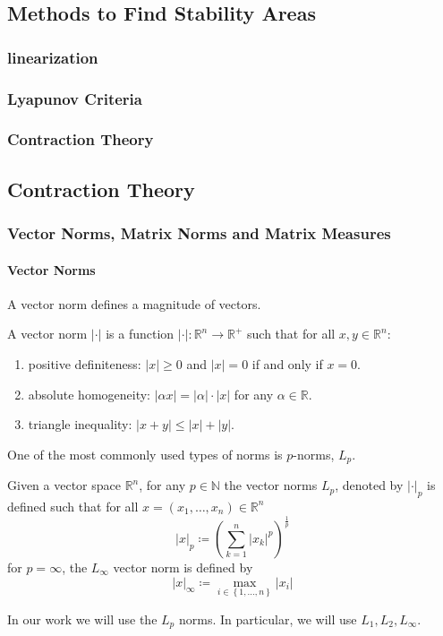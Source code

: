 \documentclass[12pt,English]{article}
\begin{document}
\subsection{Methods to Find Stability Areas}
\subsubsection{linearization}
\subsubsection{Lyapunov Criteria}
\subsubsection{Contraction Theory}

\subsection{Contraction Theory}

\subsubsection{Vector Norms, Matrix Norms and Matrix Measures}
\paragraph{Vector Norms}\hfill\break
A vector norm defines a magnitude of vectors.
\begin{defn}
A vector norm $\left|\cdot\right|$ is a function $\left|\cdot\right|:\mathbb{R}^{n}\rightarrow\mathbb{R}^{+}$
such that for all $x,y\in\mathbb{R}^{n}$:
\begin{enumerate}
\item positive definiteness: $\left|x\right|\geq0$ and $\left|x\right|=0$
if and only if $x=0$.
\item absolute homogeneity: $\left|\alpha x\right|=\left|\alpha\right|\cdot\left|x\right|$
for any $\alpha\in\mathbb{R}$.
\item triangle inequality: $\left|x+y\right|\leq\left|x\right|+\left|y\right|$.
\end{enumerate}
\end{defn}
%
One of the most commonly used types of norms is $p$-norms, $L_{p}$.
\begin{defn}
Given a vector space $\mathbb{R}^{n}$, for any $p\in\mathbb{N}$
the vector norms $L_{p}$, denoted by $\left|\cdot\right|_{p}$ is
defined such that for all $x=\left(x_{1},\dots,x_{n}\right)\in\mathbb{R}^{n}$
$$
\left|x\right|_{p}\coloneqq\left(\sum_{k=1}^{n}\left|x_{k}\right|^{p}\right)^{\frac{1}{p}}
$$
for $p=\infty$, the $L_{\infty}$ vector norm is defined by
$$
\left|x\right|_{\infty}\coloneqq\max_{i\in\left\{ 1,\dots,n\right\}}\left|x_{i}\right|
$$
\end{defn}
%
In our work we will use the $L_{p}$ norms. In particular, we will use $L_{1},L_{2},L_{\infty}$.
\end{document}
